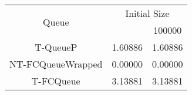 \begin{tabular}{|c|c|c|}
\hline
\multirow{2}{*}{Queue} & \multicolumn{2}{c|}{Initial Size}\\\cline{2-3}& \qquad 10000 \qquad\quad & 100000\\
\hline
\hline
T-QueueP & 1.60886 & 1.60886\\
NT-FCQueueWrapped & 0.00000 & 0.00000\\
T-FCQueue & 3.13881 & 3.13881\\
\hline\end{tabular}
